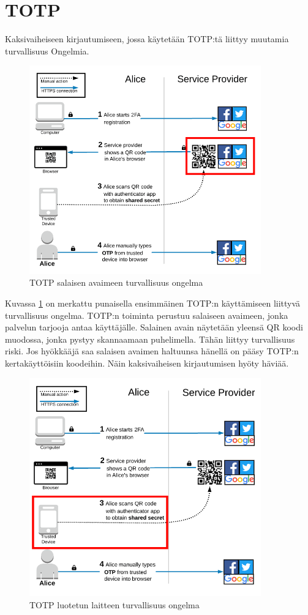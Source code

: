 \section{TOTP}

Kaksivaiheiseen kirjautumiseen, jossa käytetään TOTP:tä liittyy muutamia turvallisuus Ongelmia.

\begin{figure}[ht]
    \centering
    \includegraphics[width=10cm]{template/figures/TOTP service-provider-compromise.png}
    \caption{TOTP salaisen avaimeen turvallisuus ongelma\citep{TOTP}}
    \label{fig:TOTP_service_provider}
\end{figure}

Kuvassa \ref{fig:TOTP_service_provider} on merkattu punaisella ensimmäinen TOTP:n käyttämiseen liittyvä turvallisuus ongelma. TOTP:n toiminta perustuu salaiseen avaimeen, jonka palvelun tarjooja antaa käyttäjälle. Salainen avain näytetään yleensä QR koodi muodossa, jonka pystyy skannaamaan puhelimella. Tähän liittyy turvallisuus riski. Jos hyökkääjä saa salaisen avaimen haltuunsa hänellä on pääsy TOTP:n kertakäyttöisiin koodeihin. Näin kaksivaiheisen kirjautumisen hyöty häviää. 

\begin{figure}
    \centering
    \includegraphics[width=10cm]{template/figures/TOTP trusted-device-compromise.png}
    \caption{TOTP luotetun laitteen turvallisuus ongelma \citep{TOTP}}
    \label{fig:TOTP_device}
\end{figure}

